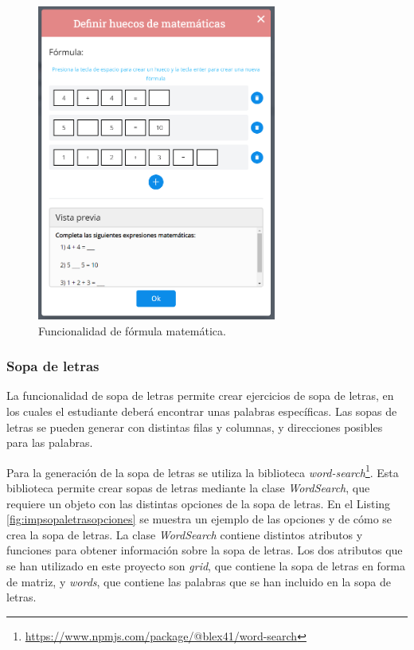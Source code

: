 \begin{figure}[ht!]
  \centering
  \includegraphics[width=0.7\textwidth]{Imagenes/Funcionalidades/MathFormulaModal.PNG}
  \caption{Funcionalidad de fórmula matemática.}
  \label{fig:funcionalidadFormulaMatematica}
\end{figure}

\subsubsection{Sopa de letras}
\label{sec:impsopaletras}
La funcionalidad de sopa de letras permite crear ejercicios de sopa de letras, en los cuales el estudiante deberá encontrar unas palabras específicas. Las sopas de letras se pueden generar con distintas filas y columnas, y direcciones posibles para las palabras.

Para la generación de la sopa de letras se utiliza la biblioteca \textit{word-search}\footnote{\url{https://www.npmjs.com/package/@blex41/word-search}}. Esta biblioteca permite crear sopas de letras mediante la clase \textit{WordSearch}, que requiere un objeto con las distintas opciones de la sopa de letras. En el Listing \ref{fig:impsopaletrasopciones} se muestra un ejemplo de las opciones y de cómo se crea la sopa de letras. La clase \textit{WordSearch} contiene distintos atributos y funciones para obtener información sobre la sopa de letras. Los dos atributos que se han utilizado en este proyecto son \textit{grid}, que contiene la sopa de letras en forma de matriz, y \textit{words}, que contiene las palabras que se han incluido en la sopa de letras.

